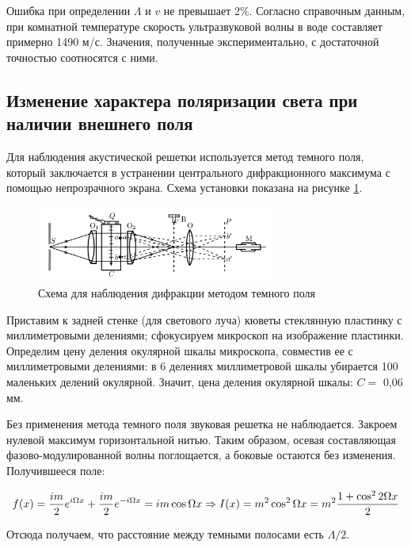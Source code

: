 \documentclass[a4paper,12pt]{article}
\begin{document}
	
Ошибка при определении $ \Lambda $ и $ v $ не превышает 2\%. Согласно справочным данным, при комнатной температуре скорость ультразвуковой волны в воде составляет примерно 1490 м/с. Значения, полученные экспериментально, с достаточной точностью соотносятся с ними.

\subsection*{Изменение характера поляризации света при наличии внешнего поля}

Для наблюдения акустической решетки используется метод темного поля, который заключается в устранении центрального дифракционного максимума с помощью непрозрачного экрана. Схема установки показана на рисунке \ref{shema2}.

\begin{figure}[bhtp!]
	\centering	
	\includegraphics[width=0.7\textwidth]{shema2.png}
	\caption{Схема для наблюдения дифракции методом темного поля}
	\label{shema2}
\end{figure}

Приставим к задней стенке (для светового луча) кюветы стеклянную пластинку с миллиметровыми делениями; сфокусируем микроскоп на изображение пластинки. Определим цену деления окулярной шкалы микроскопа, совместив ее с миллиметровыми делениями: в 6 делениях миллиметровой шкалы убирается 100 маленьких делений окулярной. Значит, цена деления окулярной шкалы: $ C = $ 0,06 мм.

Без применения метода темного поля звуковая решетка не наблюдается. Закроем нулевой максимум горизонтальной нитью. Таким образом, осевая составляющая фазово-модулированной волны поглощается, а боковые остаются без изменения. Получившееся поле: 

\begin{equation}\label{}
f(x) = \dfrac{im}{2} e^{i\Omega x} +  \dfrac{im}{2} e^{-i\Omega x} = im \cos \Omega x \Rightarrow I(x) = m^2 \cos ^2 \Omega x = m^2 \dfrac{1 + \cos ^2 2 \Omega x}{2}
\end{equation}

Отсюда получаем, что расстояние между темными полосами есть $ \Lambda/2 $.
\end{document}
